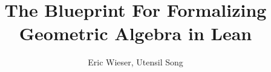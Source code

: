\title{The Blueprint For Formalizing Geometric Algebra in Lean}

\author{Eric Wieser, Utensil Song}


